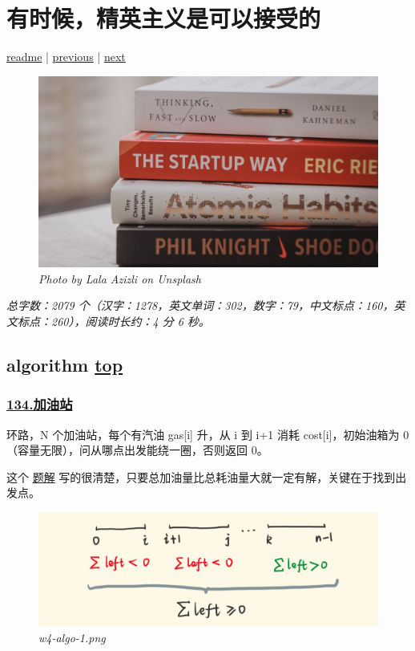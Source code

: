\chapter{有时候，精英主义是可以接受的}\label{chap:w4}

\noindent \href{https://github.com/taseikyo/arts}{readme} | \hyperref[chap:w3]{previous} | \hyperref[chap:w5]{next}

\begin{figure}[htbp]
  \centering
    \includegraphics[width=\textwidth]{../images/2020/11/lala-azizli-OFZUaeYKP3k-unsplash.jpg}
  \caption{\textit{Photo by Lala Azizli on Unsplash}}
\end{figure}

\textit{总字数：2079 个（汉字：1278，英文单词：302，数字：79，中文标点：160，英文标点：260），阅读时长约：4 分 6 秒。}

\section{algorithm \hyperref[chap:w4]{top}}\label{w4:algorithm}

\subsection{\href{https://leetcode-cn.com/problems/gas-station/}{134.加油站}}

环路，N 个加油站，每个有汽油 gas[i] 升，从 i 到 i+1 消耗 cost[i]，初始油箱为 0（容量无限），问从哪点出发能绕一圈，否则返回 0。

这个 \href{https://leetcode-cn.com/problems/gas-station/solution/shou-hua-tu-jie-liang-ge-guan-jian-jie-lun-de-jian/}{题解} 写的很清楚，只要总加油量比总耗油量大就一定有解，关键在于找到出发点。

\begin{figure}[htbp]
  \centering
    \includegraphics[width=\textwidth]{../images/2020/11/w4-algo-1.png}
  \caption{\textit{w4-algo-1.png}}
\end{figure}

